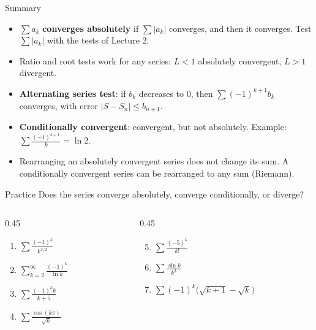 \documentclass[10pt]{wosm-slides}
\begin{document}
\begin{frame}{Summary}
  \begin{itemize}
    \item $\sum a_k$ \textbf{converges absolutely} if $\sum |a_k|$ converges, and then it
      converges. Test $\sum |a_k|$ with the tests of Lecture 2.
    \item Ratio and root tests work for any series: $L < 1$ absolutely convergent,
      $L > 1$ divergent.
    \item \textbf{Alternating series test}: if $b_k$ decreases to $0$, then
      $\sum (-1)^{k+1} b_k$ converges, with error $|S - S_n| \le b_{n+1}$.
    \item \textbf{Conditionally convergent}: convergent, but not absolutely. Example:
      $\sum \frac{(-1)^{k+1}}{k} = \ln 2$.
    \item Rearranging an absolutely convergent series does not change its sum.
      A conditionally convergent series can be rearranged to any sum (Riemann).
  \end{itemize}
\end{frame}

\begin{frame}{Practice}
  Does the series converge absolutely, converge conditionally, or diverge?
  \begin{columns}[T]
    \begin{column}{0.45\textwidth}
      \begin{enumerate}
        \item $\displaystyle\sum \frac{(-1)^k}{k^{3/2}}$
        \item $\displaystyle\sum_{k=2}^\infty \frac{(-1)^k}{\ln k}$
        \item $\displaystyle\sum \frac{(-1)^k k}{k + 5}$
        \item $\displaystyle\sum \frac{\cos(k\pi)}{\sqrt{k}}$
      \end{enumerate}
    \end{column}
    \begin{column}{0.45\textwidth}
      \begin{enumerate}
        \setcounter{enumi}{4}
        \item $\displaystyle\sum \frac{(-5)^k}{k!}$
        \item $\displaystyle\sum \frac{\sin k}{k^3}$
        \item $\displaystyle\sum (-1)^k \bigl(\sqrt{k+1} - \sqrt{k}\bigr)$
      \end{enumerate}
    \end{column}
  \end{columns}
\end{frame}
\end{document}

